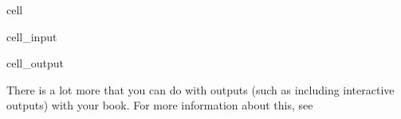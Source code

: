 \documentclass[letterpaper,10pt,english]{jupyterBook}
\begin{document}
\begin{sphinxuseclass}{cell}
\begin{sphinxVerbatimInput}
\begin{sphinxuseclass}{cell_input}
\begin{sphinxVerbatim}[commandchars=\\\{\}]
    
  
 \PYG{p}{[}  \PYG{p}{]}
\end{sphinxVerbatim}

\end{sphinxuseclass}\end{sphinxVerbatimInput}
\begin{sphinxVerbatimOutput}

\begin{sphinxuseclass}{cell_output}
\noindent{}

\end{sphinxuseclass}\end{sphinxVerbatimOutput}

\end{sphinxuseclass}
\sphinxAtStartPar
There is a lot more that you can do with outputs (such as including interactive outputs)
with your book. For more information about this, see 
\end{document}
